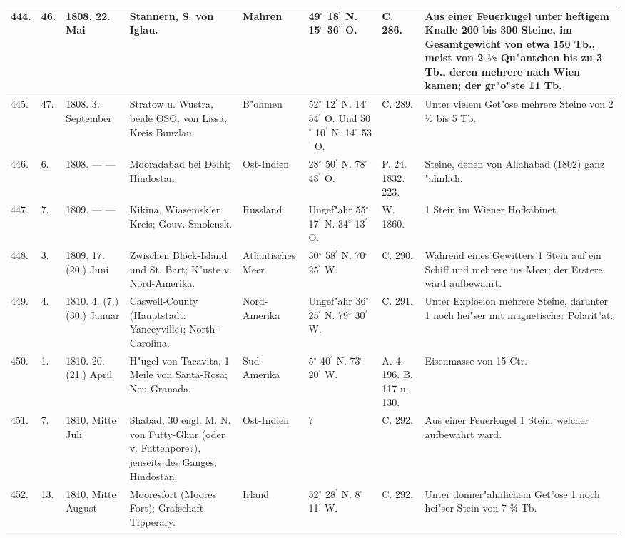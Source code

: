 \documentclass[a4paper, 8pt, oneside, polutonikogreek, german]{article}
\begin{document}
\begin{center}
\begin{longtable}{| p{4mm} | p{2mm} | p{15mm} | p{25mm} | p{16mm} | p{12mm} | p{13mm} | p{20mm} |}
        444. & 46. & 1808. 22. Mai & Stannern, S. von Iglau. & Mahren & 49$^\circ$ 18$^\prime$ N. 15$^\circ$ 36$^\prime$ O. & C. 286. & Aus einer Feuerkugel unter heftigem Knalle 200 bis 300 Steine, im Gesamtgewicht von etwa 150 Tb., meist von 2 ½ Qu"antchen bis zu 3 Tb., deren mehrere nach Wien kamen; der gr"o"ste 11 Tb. \\ \hline
        445. & 47. & 1808. 3. September & Stratow u. Wustra, beide OSO. von Lissa; Kreis Bunzlau. & B"ohmen & 52$^\circ$ 12$^\prime$ N. 14$^\circ$ 54$^\prime$ O. Und 50$^\circ$ 10$^\prime$ N. 14$^\circ$ 53$^\prime$ O. & C. 289. & Unter vielem Get"ose mehrere Steine von 2 ½ bis 5 Tb. \\ \hline
        446. & 6. & 1808. --- --- & Mooradabad bei Delhi; Hindostan. & Ost-Indien & 28$^\circ$ 50$^\prime$ N. 78$^\circ$ 48$^\prime$ O. & P. 24. 1832. 223. & Steine, denen von Allahabad (1802) ganz "ahnlich. \\ \hline
        447. & 7. & 1809. --- --- & Kikina, Wiasemsk’er Kreis; Gouv. Smolensk. & Russland & Ungef"ahr 55$^\circ$ 17$^\prime$ N. 34$^\circ$ 13$^\prime$ O. & W. 1860. & 1 Stein im Wiener Hofkabinet. \\ \hline
        448. & 3. & 1809. 17. (20.) Juni & Zwischen Block-Island und St. Bart; K"uste v. Nord-Amerika. & Atlantisches Meer & 30$^\circ$ 58$^\prime$ N. 70$^\circ$ 25$^\prime$ W. & C. 290. & Wahrend eines Gewitters 1 Stein auf ein Schiff und mehrere ins Meer; der Erstere ward aufbewahrt. \\ \hline
        449. & 4. & 1810. 4. (7.) (30.) Januar & Caswell-County (Hauptstadt: Yanceyville); North-Carolina. & Nord-Amerika & Ungef"ahr 36$^\circ$ 25$^\prime$ N. 79$^\circ$ 30$^\prime$ W. & C. 291. & Unter Explosion mehrere Steine, darunter 1 noch hei"ser mit magnetischer Polarit"at. \\ \hline
        450. & 1. & 1810. 20. (21.) April & H"ugel von Tacavita, 1 Meile von Santa-Rosa; Neu-Granada. & Sud-Amerika & 5$^\circ$ 40$^\prime$ N. 73$^\circ$ 20$^\prime$ W. & A. 4. 196. B. 117 u. 130. & Eisenmasse von 15 Ctr. \\ \hline
        451. & 7. & 1810. Mitte Juli & Shabad, 30 engl. M. N. von Futty-Ghur (oder v. Futtehpore?), jenseits des Ganges; Hindostan. & Ost-Indien & ? & C. 292. & Aus einer Feuerkugel 1 Stein, welcher aufbewahrt ward. \\ \hline
        452. & 13. & 1810. Mitte August & Mooresfort (Moores Fort); Grafschaft Tipperary. & Irland & 52$^\circ$ 28$^\prime$ N. 8$^\circ$ 11$^\prime$ W. & C. 292. & Unter donner"ahnlichem Get"ose 1 noch hei"ser Stein von 7 ¾ Tb. \\ \hline

\end{longtable}
\end{center}
\end{document}
